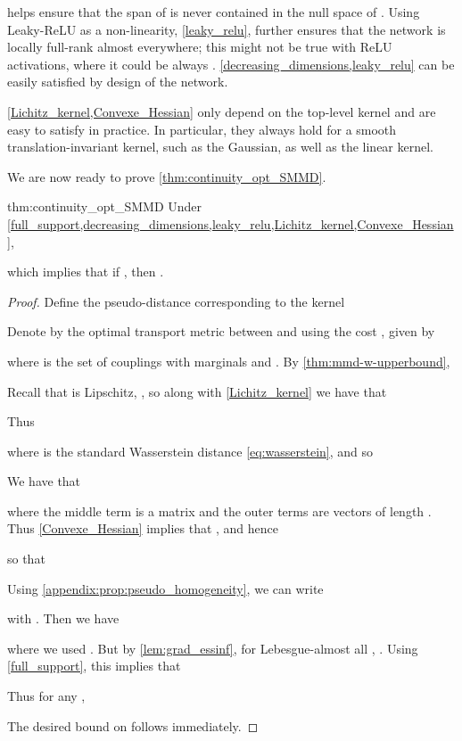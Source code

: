 \documentclass{article}
\begin{document}
 helps ensure that the span of  is never contained in the null space of .
Using Leaky-ReLU as a non-linearity, \cref{leaky_relu},
further ensures that
the network  is locally full-rank almost everywhere;
this might not be true with ReLU activations, where it could be always .
\cref{decreasing_dimensions,leaky_relu} can be easily satisfied by design of the network.


\cref{Lichitz_kernel,Convexe_Hessian} only depend on the top-level kernel  and are easy to satisfy in practice.
In particular, they always hold for a smooth translation-invariant kernel, such as the Gaussian,
as well as the linear kernel.

We are now ready to prove \cref{thm:continuity_opt_SMMD}.

\begin{reptheorem}{thm:continuity_opt_SMMD}
Under \cref{full_support,decreasing_dimensions,leaky_relu,Lichitz_kernel,Convexe_Hessian},

which implies that if ,
then .
\end{reptheorem}
\begin{proof}

Define the pseudo-distance corresponding to the kernel 

Denote by  the optimal transport metric
between  and  using the cost , given by

where  is the set of couplings with marginals  and .
By \cref{thm:mmd-w-upperbound},

Recall that  is Lipschitz,
,
so along with \cref{Lichitz_kernel} we have that

Thus

where  is the standard Wasserstein distance \eqref{eq:wasserstein},
and so


We have that

where the middle term is a  matrix
and the outer terms are vectors of length .
Thus \cref{Convexe_Hessian} implies that
,
and hence

so that


Using \cref{appendix:prop:pseudo_homogeneity}, we can write

with .
Then we have

where we used
.
But by \cref{lem:grad_essinf},
for Lebesgue-almost all ,
.
Using \cref{full_support},
this implies that


Thus for any ,

The desired bound on  follows immediately.
\end{proof}
\end{document}
